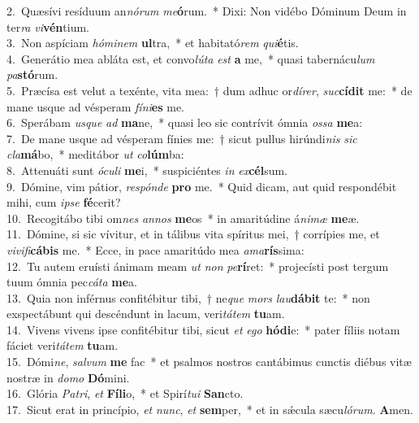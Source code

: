 {2.~}Quæsívi resíduum an\textit{nó}\textit{rum} \textit{me}\textbf{ó}rum.~* Dixi: Non vidébo Dóminum Deum in ter\textit{ra} \textit{vi}\textbf{vén}tium.\\
{3.~}Non aspíciam \textit{hó}\textit{mi}\textit{nem} \textbf{ul}tra,~* et habitató\textit{rem} \textit{qui}\textbf{é}tis.\\
{4.~}Generátio mea abláta est, et convo\textit{lú}\textit{ta} \textit{est} \textbf{a} me,~* quasi tabernácu\textit{lum} \textit{pa}\textbf{stó}rum.\\
{5.~}Præcísa est velut a texénte, vita mea:~† dum adhuc or\textit{dí}\textit{rer}, \textit{suc}\textbf{cí}\textbf{dit} me:~* de mane usque ad vésperam \textit{fí}\textit{ni}\textbf{es} me.\\
{6.~}Sperábam \textit{us}\textit{que} \textit{ad} \textbf{ma}ne,~* quasi leo sic contrívit ómnia \textit{os}\textit{sa} \textbf{me}a:\\
{7.~}De mane usque ad vésperam fínies me:~† sicut pullus hirúndi\textit{nis} \textit{sic} \textit{cla}\textbf{má}bo,~* meditábor \textit{ut} \textit{co}\textbf{lúm}ba:\\
{8.~}Attenuáti sunt \textit{ó}\textit{cu}\textit{li} \textbf{me}i,~* suspiciéntes \textit{in} \textit{ex}\textbf{cél}sum.\\
{9.~}Dómine, vim pátior, \textit{re}\textit{spón}\textit{de} \textbf{pro} me.~* Quid dicam, aut quid respondébit mihi, cum \textit{i}\textit{pse} \textbf{fé}cerit?\\
{10.~}Recogitábo tibi om\textit{nes} \textit{an}\textit{nos} \textbf{me}os~* in amaritúdine á\textit{ni}\textit{mæ} \textbf{me}æ.\\
{11.~}Dómine, si sic vívitur, et in tálibus vita spíritus mei,~† corrípies me, et \textit{vi}\textit{vi}\textit{fi}\textbf{cá}\textbf{bis} me.~* Ecce, in pace amaritúdo mea \textit{a}\textit{ma}\textbf{rís}sima:\\
{12.~}Tu autem eruísti ánimam meam \textit{ut} \textit{non} \textit{pe}\textbf{rí}ret:~* projecísti post tergum tuum ómnia pec\textit{cá}\textit{ta} \textbf{me}a.\\
{13.~}Quia non inférnus confitébitur tibi,~† ne\textit{que} \textit{mors} \textit{lau}\textbf{dá}\textbf{bit} te:~* non exspectábunt qui descéndunt in lacum, veri\textit{tá}\textit{tem} \textbf{tu}am.\\
{14.~}Vivens vivens ipse confitébitur tibi, sicut \textit{et} \textit{e}\textit{go} \textbf{hó}\textbf{di}e:~* pater fíliis notam fáciet veri\textit{tá}\textit{tem} \textbf{tu}am.\\
{15.~}Dómi\textit{ne}, \textit{sal}\textit{vum} \textbf{me} fac~* et psalmos nostros cantábimus cunctis diébus vitæ nostræ in \textit{do}\textit{mo} \textbf{Dó}mini.\\
{16.~}Glória \textit{Pa}\textit{tri}, \textit{et} \textbf{Fí}\textbf{li}o,~* et Spirí\textit{tu}\textit{i} \textbf{San}cto.\\
{17.~}Sicut erat in princípio, \textit{et} \textit{nunc}, \textit{et} \textbf{sem}per,~* et in sǽcula sæcu\textit{ló}\textit{rum}. \textbf{A}men.\\
